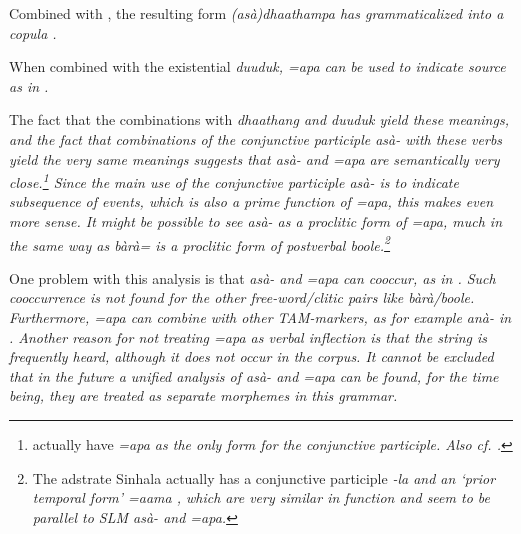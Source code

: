 
Combined with , the resulting form \em (asà)dhaathampa \em has grammaticalized into a copula .

When combined with  the existential \em duuduk\em, \em =apa \em can be used to indicate source as in .

 
The fact that the combinations with \em dhaathang \em and \em duuduk \em yield these meanings, and the fact that combinations of the conjunctive participle \em asà- \em with these verbs yield the very same meanings  suggests that \em asà- \em and \em =apa \em are semantically very close.\footnote{\citet{SmithEtAl2004} actually have \em =apa \em as the only form for the conjunctive participle. Also cf. \citet[143]{Bakker2006}.} Since the main use of the conjunctive participle \em asà- \em is to indicate subsequence of events, which is also a prime function of \em =apa\em, this makes even more sense. It might be possible to see \em asà- \em as a proclitic form of \em =apa\em, much in the same way as \em bàrà= \em is a proclitic form of postverbal \em boole\em.\footnote{The adstrate Sinhala actually has a conjunctive participle \em -la \em and an `prior temporal form' \em =aama \em  \citep{Gair1976verbsinhala,Gair2003}, which are very similar in function and seem to be parallel to SLM \em asà- \em and \em =apa\em.}

One problem with this analysis is that \em asà- \em and \em =apa \em can cooccur, as in . Such cooccurrence is not found for the other free-word/clitic pairs like \em bàrà/boole\em. Furthermore, \em =apa \em can combine with other TAM-markers, as for example \em anà- \em in .  Another reason for not treating \em =apa \em as verbal inflection is that the string  is frequently heard, although it does not occur in the corpus. It cannot be excluded that in the future a unified analysis of \em asà- \em and \em =apa \em can be found, for the time being, they are treated as separate morphemes in this grammar.


